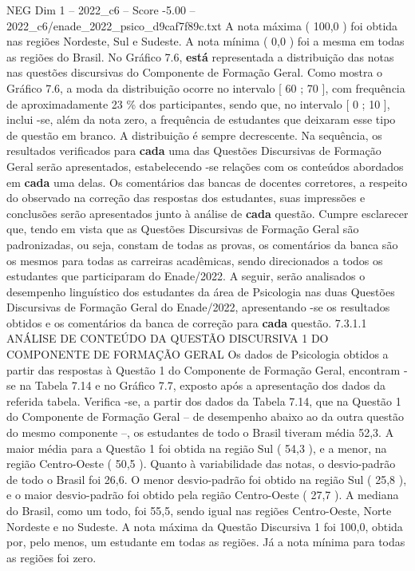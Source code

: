 \begin{textsample}{NEG Dim 1 – 2022\_c6 – Score -5.00 – 2022\_c6/enade\_2022\_psico\_d9caf7f89c.txt}
A nota máxima ( 100,0 ) foi obtida nas regiões Nordeste, Sul e Sudeste.
A nota mínima ( 0,0 ) foi a mesma em todas as regiões do Brasil.
No Gráfico 7.6, \textbf{está} representada a distribuição das notas nas questões discursivas do Componente de Formação Geral.
Como mostra o Gráfico 7.6, a moda da distribuição ocorre no intervalo [ 60 ; 70 ], com frequência de aproximadamente 23 \% dos participantes, sendo que, no intervalo [ 0 ; 10 ], inclui -se, além da nota zero, a frequência de estudantes que deixaram esse tipo de questão em branco.
A distribuição é sempre decrescente.
Na sequência, os resultados verificados para \textbf{cada} uma das Questões Discursivas de Formação Geral serão apresentados, estabelecendo -se relações com os conteúdos abordados em \textbf{cada} uma delas.
Os comentários das bancas de docentes corretores, a respeito do observado na correção das respostas dos estudantes, suas impressões e conclusões serão apresentados junto à análise de \textbf{cada} questão.
Cumpre esclarecer que, tendo em vista que as Questões Discursivas de Formação Geral são padronizadas, ou seja, constam de todas as provas, os comentários da banca são os mesmos para todas as carreiras acadêmicas, sendo direcionados a todos os estudantes que participaram do Enade/2022.
A seguir, serão analisados o desempenho linguístico dos estudantes da área de Psicologia nas duas Questões Discursivas de Formação Geral do Enade/2022, apresentando -se os resultados obtidos e os comentários da banca de correção para \textbf{cada} questão. 7.3.1.1 ANÁLISE DE CONTEÚDO DA QUESTÃO DISCURSIVA 1 DO COMPONENTE DE FORMAÇÃO GERAL Os dados de Psicologia obtidos a partir das respostas à Questão 1 do Componente de Formação Geral, encontram -se na Tabela 7.14 e no Gráfico 7.7, exposto após a apresentação dos dados da referida tabela.
Verifica -se, a partir dos dados da Tabela 7.14, que na Questão 1 do Componente de Formação Geral – de desempenho abaixo ao da outra questão do mesmo componente –, os estudantes de todo o Brasil tiveram média 52,3.
A maior média para a Questão 1 foi obtida na região Sul ( 54,3 ), e a menor, na região Centro-Oeste ( 50,5 ).
Quanto à variabilidade das notas, o desvio-padrão de todo o Brasil foi 26,6.
O menor desvio-padrão foi obtido na região Sul ( 25,8 ), e o maior desvio-padrão foi obtido pela região Centro-Oeste ( 27,7 ).
A mediana do Brasil, como um todo, foi 55,5, sendo igual nas regiões Centro-Oeste, Norte Nordeste e no Sudeste.
A nota máxima da Questão Discursiva 1 foi 100,0, obtida por, pelo menos, um estudante em todas as regiões.
Já a nota mínima para todas as regiões foi zero.

\end{textsample}
